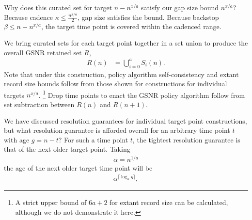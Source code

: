 




Why does this curated set for target $n - n^{x/a}$ satisfy our gap size bound $n^{x/a}$?
Because cadence $\kappa \leq \frac{n^{x/a}}{2}$, gap size satisfies the bound.
Because backstop $\beta \leq n - n ^{x/a}$, the target time point is covered within the cadenced range.

We bring curated sets for each target point together in a set union to produce the overall GSNR retained set $R$,
\begin{align*}
  R(n)
  &=
  \bigcup_{i=0}^{a} S_i(n).
\end{align*}
Note that under this construction, policy algorithm self-consistency and extant record size bounds follow from those shown for constructions for individual targets $n^{x/a}$.
\footnote{
A strict upper bound of $6a + 2$ for extant record size can be calculated, although we do not demonstrate it here.
}
Drop time points to enact the GSNR policy algorithm follow from set subtraction between $R(n)$ and $R(n+1)$.

We have discussed resolution guarantees for individual target point constructions, but what resolution guarantee is afforded overall for an arbitrary time point $t$ with age $g = n - t$?
For such a time point $t$, the tightest resolution guarantee is that of the next older target point.
Taking
\begin{align*}
\alpha = n^{1/a}
\end{align*}
the age of the next older target time point will be
\begin{align*}
\alpha^{ \lceil \log_{\alpha} g \rceil },
\end{align*}

